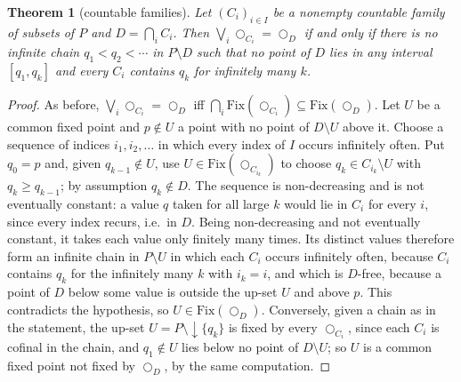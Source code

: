 \documentclass[11pt]{amsart}
\newtheorem{thm}{Theorem}[section]
\theoremstyle{definition}
\newcommand{\Fix}{\mathrm{Fix}}
\newcommand{\lax}{\bigcirc}
\newcommand{\dn}{{\downarrow}}
\begin{document}
\begin{thm}[countable families]\label{thm:family}
Let $(C_i)_{i\in I}$ be a nonempty countable family of subsets of $P$ and $D=\bigcap_iC_i$. Then
$\bigvee_i\lax_{C_i}=\lax_D$ if and only if there is no infinite chain
$q_1<q_2<\cdots$ in $P\setminus D$ such that no point of $D$ lies in any
interval $[q_1,q_k]$ and every $C_i$ contains $q_k$ for infinitely many $k$.
\end{thm}
\begin{proof}
As before, $\bigvee_i\lax_{C_i}=\lax_D$ iff $\bigcap_i\Fix(\lax_{C_i})\subseteq
\Fix(\lax_D)$. Let $U$ be a common fixed point and $p\notin U$ a point with no
point of $D\setminus U$ above it. Choose a sequence of indices $i_1,i_2,\dots$
in which every index of $I$ occurs infinitely often. Put $q_0=p$ and, given
$q_{k-1}\notin U$, use $U\in\Fix(\lax_{C_{i_k}})$ to choose
$q_k\in C_{i_k}\setminus U$ with $q_k\ge q_{k-1}$; by assumption $q_k\notin D$.
The sequence is non-decreasing and is not eventually constant: a value $q$
taken for all large $k$ would lie in $C_i$ for every $i$, since every index
recurs, i.e.\ in $D$. Being non-decreasing and not eventually constant, it
takes each value only finitely many times. Its distinct values therefore form
an infinite chain in $P\setminus U$ in which each $C_i$ occurs infinitely
often, because $C_i$ contains $q_k$ for the infinitely many $k$ with $i_k=i$,
and which is $D$-free, because a point of $D$ below some value is
outside the up-set $U$ and above $p$. This contradicts the hypothesis, so
$U\in\Fix(\lax_D)$. Conversely, given a chain as in the statement, the up-set
$U=P\setminus\dn\{q_k\}$ is fixed by every $\lax_{C_i}$, since each $C_i$ is
cofinal in the chain, and $q_1\notin U$ lies below no point of $D\setminus U$;
so $U$ is a common fixed point not fixed by $\lax_D$, by the same computation.
\end{proof}
\end{document}
